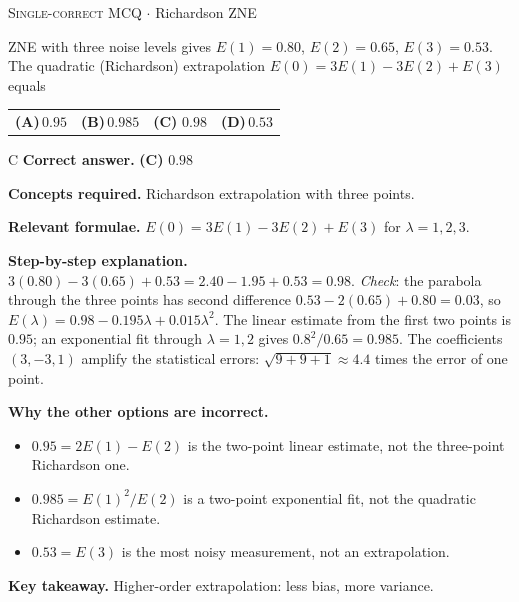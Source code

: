 \documentclass[11pt,a4paper]{article}
\newcommand{\optlabel}[1]{\textbf{(#1)}}
\newcommand{\correctlabel}[1]{\textcolor{okgreen}{\textbf{(#1)}\,\ding{51}}}
\newenvironment{qitem}[1]{\begin{list}{}{\setlength{\leftmargin}{3.3em}\setlength{\labelwidth}{3.1em}%
  \setlength{\labelsep}{0.2em}\setlength{\topsep}{3pt}\setlength{\parsep}{3pt}}\item[\textbf{Q.#1}\hfill]}{\end{list}}
\newcommand{\qsep}{\par\vspace{2pt}{\color{black!15}\hrule}\vspace{4pt}}
\newcommand{\qmeta}[2]{{\footnotesize\color{black!60}\textsc{#1} \;$\cdot$\; #2}\par}
\begin{document}
\begin{qitem}{64}
\qmeta{Single-correct MCQ}{Richardson ZNE}
ZNE with three noise levels gives $E(1) = 0.80$, $E(2) = 0.65$, $E(3) = 0.53$. The quadratic (Richardson) extrapolation $E(0) = 3E(1) - 3E(2) + E(3)$ equals
\par\smallskip\noindent\begin{tabularx}{\linewidth}{@{}*{4}{L}@{}}
\optlabel{A}\,$0.95$ & \optlabel{B}\,$0.985$ & \correctlabel{C}\,$0.98$ & \optlabel{D}\,$0.53$
\end{tabularx}
\end{qitem}
\begin{solbox}{C}
\textbf{\color{brand}Correct answer.} \textcolor{okgreen}{\textbf{(C)}} $0.98$

\textbf{\color{brand}Concepts required.} Richardson extrapolation with three points.

\textbf{\color{brand}Relevant formulae.} $E(0) = 3E(1) - 3E(2) + E(3)$ for $\lambda = 1, 2, 3$.

\textbf{\color{brand}Step-by-step explanation.} $3(0.80) - 3(0.65) + 0.53 = 2.40 - 1.95 + 0.53 = 0.98$. \emph{Check}: the parabola through the three points has second difference
$0.53 - 2(0.65) + 0.80 = 0.03$, so $E(\lambda) = 0.98 - 0.195\lambda + 0.015\lambda^2$. The linear estimate from the first two points is $0.95$; an exponential fit through $\lambda = 1, 2$ gives $0.8^2/0.65 = 0.985$.
The coefficients $(3, -3, 1)$ amplify the statistical errors: $\sqrt{9 + 9 + 1} \approx 4.4$ times the error of one point.

\textbf{\color{brand}Why the other options are incorrect.}
\begin{itemize}[leftmargin=2.4em, itemsep=1pt, topsep=2pt]
\item[\textbf{(A)}] $0.95 = 2E(1) - E(2)$ is the two-point linear estimate, not the three-point Richardson one.
\item[\textbf{(B)}] $0.985 = E(1)^2/E(2)$ is a two-point exponential fit, not the quadratic Richardson estimate.
\item[\textbf{(D)}] $0.53 = E(3)$ is the most noisy measurement, not an extrapolation.
\end{itemize}
\textbf{\color{brand}Key takeaway.} Higher-order extrapolation: less bias, more variance.
\end{solbox}
\qsep
\end{document}
